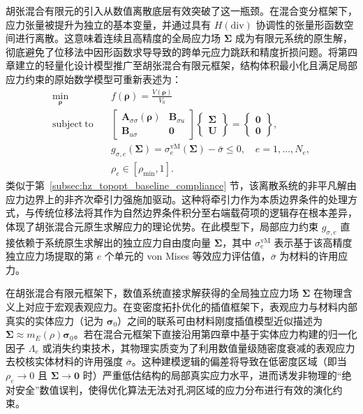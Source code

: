 胡张混合有限元的引入从数值离散底层有效突破了这一瓶颈。在混合变分框架下，应力张量被提升为独立的基本变量，并通过具有 $H(\mathrm{div})$ 协调性的张量形函数空间进行离散。这意味着连续且高精度的全局应力场 $\boldsymbol{\Sigma}$ 成为有限元系统的原生解，彻底避免了位移法中因形函数求导导致的跨单元应力跳跃和精度折损问题。将第四章建立的轻量化设计模型推广至胡张混合有限元框架，结构体积最小化且满足局部应力约束的原始数学模型可重新表述为：
\begin{equation} \label{eq:ch5_hz_stress_constraint_model}
	\begin{aligned} 
		\min_{\boldsymbol{\rho}} \quad & f(\boldsymbol{\rho}) = \frac{V(\boldsymbol{\rho})}{V_0} \\ 
		\mathrm{subject~to} \quad & 
		\begin{bmatrix}
			\boldsymbol{A}_{\sigma\sigma}(\boldsymbol{\rho}) & \boldsymbol{B}_{\sigma{u}}\\
			\boldsymbol{B}_{u\sigma} & \boldsymbol{0}
		\end{bmatrix}
		\begin{Bmatrix}
			\boldsymbol\Sigma\\
			\boldsymbol{U}
		\end{Bmatrix} =  
		\begin{Bmatrix}
			\boldsymbol{0}\\
			\boldsymbol{0}
		\end{Bmatrix}, \\
		& g_{\sigma, e}(\boldsymbol{\Sigma}) = \sigma_{e}^{\text{vM}}(\boldsymbol{\Sigma}) - \bar{\sigma} \le 0, \quad e = 1, \dots, N_e, \\ 
		& \rho_e \in [\rho_{\min}, 1].
	\end{aligned}
\end{equation}
类似于第~\ref{subsec:hz_topopt_baseline_compliance} 节，该离散系统的非平凡解由应力边界上的非齐次牵引力强施加驱动。这种将牵引力作为本质边界条件的处理方式，与传统位移法将其作为自然边界条件积分至右端载荷项的逻辑存在根本差异，体现了胡张混合元原生求解应力的理论优势。在此模型下，局部应力约束 $g_{\sigma, e}$ 直接依赖于系统原生求解出的独立应力自由度向量 $\boldsymbol{\Sigma}$，其中 $\sigma_e^{\mathrm{vM}}$ 表示基于该高精度独立应力场提取的第 $e$ 个单元的 von Mises 等效应力评估值，$\bar{\sigma}$ 为材料的许用应力。

在胡张混合有限元框架下，数值系统直接求解获得的全局独立应力场 $\boldsymbol{\Sigma}$ 在物理含义上对应于宏观表观应力。在变密度拓扑优化的插值框架下，表观应力与材料内部真实的实体应力（记为 $\boldsymbol{\sigma}_0$）之间的联系可由材料刚度插值模型近似描述为 $\boldsymbol{\Sigma} \approx m_E(\rho) \boldsymbol{\sigma}_0$。若在混合元框架下直接沿用第四章中基于实体应力构建的归一化因子 $\Lambda_e$ 或消失约束技术，其物理实质变为了利用数值量级随密度衰减的表观应力去校核实体材料的许用强度 $\bar{\sigma}$。这种建模逻辑的偏差将导致在低密度区域（即当 $\rho_e \to 0$ 且 $\boldsymbol{\Sigma} \to \boldsymbol{0}$ 时）严重低估结构的局部真实应力水平，进而诱发非物理的“绝对安全”数值误判，使得优化算法无法对孔洞区域的应力分布进行有效的演化约束。

